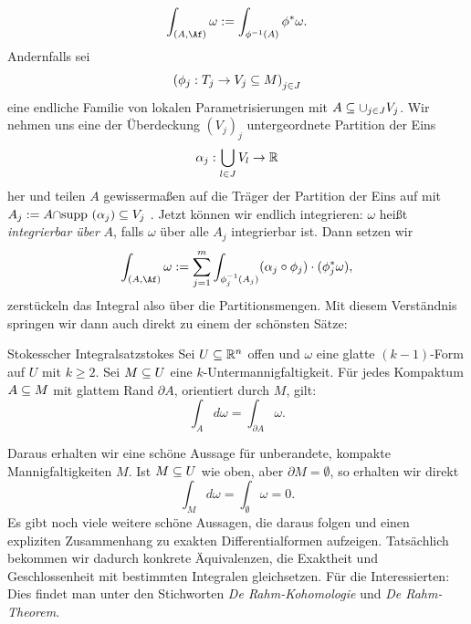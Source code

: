 \begin{equation}
\int_{(A, \Af)} \omega := \int_{\phi^{-1}(A)} \phi^\ast \omega.
\end{equation}
Andernfalls sei
\begin{equation}
\left( \phi_j: T_j \to V_j \sub M \right)_{j \in J}
\end{equation}
eine endliche Familie von lokalen Parametrisierungen mit $A \subseteq \cup_{j \in J} V_j$. Wir nehmen uns eine der Überdeckung $(V_j)_j$ untergeordnete Partition der Eins
\begin{equation}
\alpha_j: \bigcup_{l \in J} V_l \to \mathbb{R}
\end{equation}
her und teilen $A$ gewissermaßen auf die Träger der Partition der Eins auf mit $A_j := A \cap \supp(\alpha_j) \sub V_j$ . Jetzt können wir endlich integrieren: $\omega$ heißt \textit{integrierbar über} $A$, falls $\omega$ über alle $A_j$ integrierbar ist. Dann setzen wir
\begin{equation}
\int_{(A, \Af)} \omega := \sum_{j=1}^m \int_{\phi_j^{-1}(A_j)} (\alpha_j \circ \phi_j) \cdot (\phi_j^\ast \omega),
\end{equation}
zerstückeln das Integral also über die Partitionsmengen. Mit diesem Verständnis springen wir dann auch direkt zu einem der schönsten Sätze:
\begin{theorem}{Stokesscher Integralsatz}{stokes}
Sei $U \subseteq \mathbb{R}^n$ offen und $\omega$ eine glatte $(k-1)$-Form auf $U$ mit $k \geq 2$. Sei $M \subseteq U$ eine $k$-Untermannigfaltigkeit. Für jedes Kompaktum $A \subseteq M$ mit glattem Rand $\partial A$, orientiert durch $M$, gilt:
\begin{equation}
\int_A d\omega = \int_{\partial A} \omega.
\end{equation}
\end{theorem}
Daraus erhalten wir eine schöne Aussage für unberandete, kompakte Mannigfaltigkeiten $M$. Ist $M \subseteq U$ wie oben, aber $\partial M = \emptyset$, so erhalten wir direkt
\begin{equation}
\int_M d\omega = \int_\emptyset \omega = 0.
\end{equation}
Es gibt noch viele weitere schöne Aussagen, die daraus folgen und einen expliziten Zusammenhang zu exakten Differentialformen aufzeigen. Tatsächlich bekommen wir dadurch konkrete Äquivalenzen, die Exaktheit und Geschlossenheit mit bestimmten Integralen gleichsetzen. Für die Interessierten: Dies findet man unter den Stichworten \textit{De Rahm-Kohomologie} und \textit{De Rahm-Theorem}.